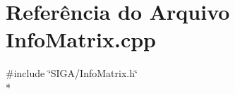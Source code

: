 \section{Referência do Arquivo Info\+Matrix.\+cpp}
\label{_info_matrix_8cpp}
{\ttfamily \#include \char`\"{}S\+I\+G\+A/\+Info\+Matrix.\+h\char`\"{}}\\*
